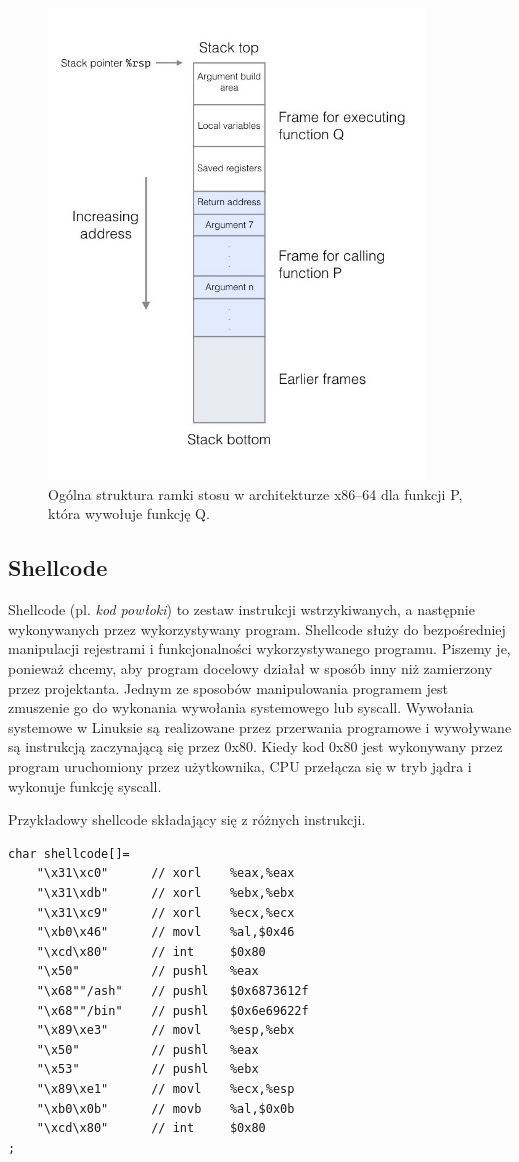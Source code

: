 \documentclass[12pt,a4paper,titlepage]{article}
\begin{document}
\begin{figure}[H]
\centering
\includegraphics[width=10cm]{images/stack.jpeg}
\caption{Ogólna struktura ramki stosu w architekturze x86–64 dla funkcji P, która wywołuje funkcję Q.}
\label{fig:stack}
\end{figure}

\subsection{Shellcode}
Shellcode (pl. \textit{kod powłoki}) to zestaw instrukcji wstrzykiwanych, a następnie wykonywanych przez wykorzystywany program. Shellcode służy do bezpośredniej manipulacji rejestrami i funkcjonalności wykorzystywanego programu. Piszemy je, ponieważ chcemy, aby program docelowy działał w sposób inny niż zamierzony przez projektanta. Jednym ze sposobów manipulowania programem jest zmuszenie go do wykonania wywołania systemowego lub syscall. Wywołania systemowe w Linuksie są realizowane przez przerwania programowe i wywoływane są instrukcją zaczynającą się przez 0x80. Kiedy kod 0x80 jest wykonywany przez program uruchomiony przez użytkownika, CPU przełącza się w tryb jądra i wykonuje funkcję syscall.~\cite{shellcode}

\begin{listing}[H]
\caption{Przykładowy shellcode składający się z różnych instrukcji.}
\begin{verbatim}
char shellcode[]=          
    "\x31\xc0"      // xorl    %eax,%eax
    "\x31\xdb"      // xorl    %ebx,%ebx
    "\x31\xc9"      // xorl    %ecx,%ecx
    "\xb0\x46"      // movl    %al,$0x46
    "\xcd\x80"      // int     $0x80
    "\x50"          // pushl   %eax
    "\x68""/ash"    // pushl   $0x6873612f
    "\x68""/bin"    // pushl   $0x6e69622f
    "\x89\xe3"      // movl    %esp,%ebx
    "\x50"          // pushl   %eax
    "\x53"          // pushl   %ebx
    "\x89\xe1"      // movl    %ecx,%esp
    "\xb0\x0b"      // movb    %al,$0x0b
    "\xcd\x80"      // int     $0x80
;
\end{verbatim}
\end{listing}
\end{document}
